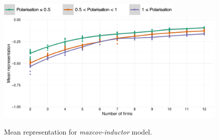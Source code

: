 \documentclass[preprint, 12pt]{elsarticle}
\begin{document}
\begin{figure}[ht]
	\centering
	\includegraphics[width=90mm]{Graphics/legend_pol.pdf}
	\includegraphics[width=\textwidth]{Graphics/fig613a.pdf}
	\caption{Mean representation for \emph{maxcov-inductor} model.}
	\label{fig:representation_mi}
\end{figure}



\newpage
%

\raggedright
\singlespacing

\end{document}
